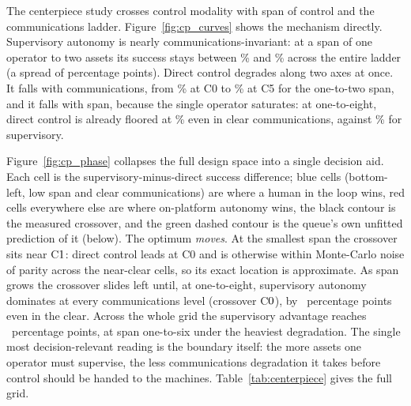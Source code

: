\documentclass[11pt]{article}
\begin{document}
The centerpiece study crosses control modality with span of control and the communications ladder. Figure~\ref{fig:cp_curves} shows the mechanism directly. Supervisory autonomy is nearly communications-invariant: at a span of one operator to two assets its success stays between \cpSupLoSpanMin\% and \cpSupLoSpanMax\% across the entire ladder (a spread of \cpSupLoSpanSpread{} percentage points). Direct control degrades along two axes at once. It falls with communications, from \cpDirClearLoSpan\% at C0 to \cpDirSevereLoSpan\% at C5 for the one-to-two span, and it falls with span, because the single operator saturates: at one-to-eight, direct control is already floored at \cpDirClearHiSpan\% even in clear communications, against \cpSupClearHiSpan\% for supervisory.

Figure~\ref{fig:cp_phase} collapses the full design space into a single decision aid. Each cell is the supervisory-minus-direct success difference; blue cells (bottom-left, low span and clear communications) are where a human in the loop wins, red cells everywhere else are where on-platform autonomy wins, the black contour is the measured crossover, and the green dashed contour is the queue's own unfitted prediction of it (below). The optimum \emph{moves}. At the smallest span the crossover sits near C$1{}$: direct control leads at C0 and is otherwise within Monte-Carlo noise of parity across the near-clear cells, so its exact location is approximate. As span grows the crossover slides left until, at one-to-eight, supervisory autonomy dominates at every communications level (crossover C$0{}$), by \cpDeltaHiSpanClear{}~percentage points even in the clear. Across the whole grid the supervisory advantage reaches \cpDeltaMax{}~percentage points, at span one-to-six under the heaviest degradation. The single most decision-relevant reading is the boundary itself: the more assets one operator must supervise, the less communications degradation it takes before control should be handed to the machines. Table~\ref{tab:centerpiece} gives the full grid.
\end{document}
